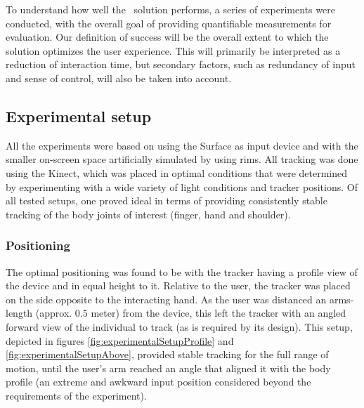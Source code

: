

\noi To understand how well the \AirSwipe\ solution performs, a series of experiments were conducted, with the overall goal of providing quantifiable measurements for evaluation. Our definition of success will be the overall extent to which the solution optimizes the user experience. This will primarily be interpreted as a reduction of interaction time, but secondary factors, such as redundancy of input and sense of control, will also be taken into account.\\


\subsection{Experimental setup}

All the experiments were based on using the Surface as input device and with the smaller on-screen space artificially simulated by using rims. All tracking was done using the Kinect, which was placed in optimal conditions that were determined by experimenting with a wide variety of light conditions and tracker positions. Of all tested setups, one proved ideal in terms of providing consistently stable tracking of the body joints of interest (finger, hand and shoulder).

\subsubsection{Positioning}

The optimal positioning was found to be with the tracker having a profile view of the device and in equal height to it. Relative to the user, the tracker was placed on the side opposite to the interacting hand. As the user was distanced an arms-length (approx. $0.5$ meter) from the device, this left the tracker with an angled forward view of the individual to track (as is required by its design). This setup, depicted in figures \ref{fig:experimentalSetupProfile} and \ref{fig:experimentalSetupAbove}, provided stable tracking for the full range of motion, until the user's arm reached an angle that aligned it with the body profile  (an extreme and awkward input position considered beyond the requirements of the experiment). 

